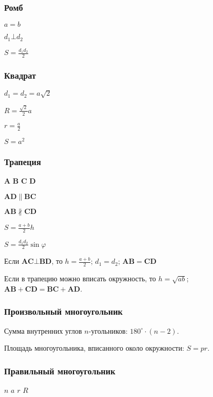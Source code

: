 \subsubsection{Ромб}

$ a = b $

$ d_1 \bot d_2 $

$ S = \frac{d_1 d_2}{2} $

\subsubsection{Квадрат}

$ d_1 = d_2 = a\sqrt{2} $

$ R = \frac{\sqrt{2}}{2} a $

$ r = \frac{a}{2} $

$ S = a^2 $

\subsubsection{Трапеция}

$\boldsymbol{A}$
$\boldsymbol{B}$
$\boldsymbol{C}$
$\boldsymbol{D}$

$ \boldsymbol{AD} \parallel \boldsymbol{BC} $

$ \boldsymbol{AB} \nparallel \boldsymbol{CD} $

$ S = \frac{a + b}{2} h $

$ S = \frac{d_1 d_2}{2} \sin \varphi $

Если $ \boldsymbol{AC} \bot \boldsymbol{BD} $, то $ h = \frac{a + b}{2} $; $ d_1 = d_2 $; $ \boldsymbol{AB} = \boldsymbol{CD} $

Если в трапецию можно вписать окружность, то $ h = \sqrt{ab}$; $ \boldsymbol{AB} + \boldsymbol{CD} = \boldsymbol{BC} + \boldsymbol{AD} $.

\subsubsection{Произвольный многоугольник}

Сумма внутренних углов $n$-угольников: $ 180^{\circ}\cdot (n-2) $.

Площадь многоугольника, вписанного около окружности: $S = p r$.

\subsubsection{Правильный многоугольник}

$n$
$a$
$r$
$R$

